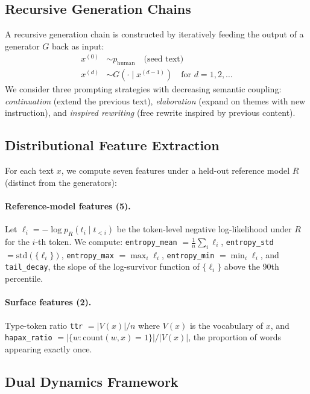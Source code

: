 \documentclass[letterpaper]{article}
\newcommand{\feat}[1]{\texttt{#1}}
\begin{document}
\subsection{Recursive Generation Chains}

A recursive generation chain is constructed by iteratively feeding the output of a generator $G$ back as input:
\begin{align}
    x^{(0)} &\sim p_{\text{human}} \quad \text{(seed text)} \\
    x^{(d)} &\sim G(\cdot \mid x^{(d-1)}) \quad \text{for } d = 1, 2, \ldots
\end{align}
We consider three prompting strategies with decreasing semantic coupling: \emph{continuation} (extend the previous text), \emph{elaboration} (expand on themes with new instruction), and \emph{inspired rewriting} (free rewrite inspired by previous content).

\subsection{Distributional Feature Extraction}

For each text $x$, we compute seven features under a held-out reference model $R$ (distinct from the generators):

\paragraph{Reference-model features (5).}
Let $\ell_i = -\log p_R(t_i \mid t_{<i})$ be the token-level negative log-likelihood under $R$ for the $i$-th token.
We compute: \feat{entropy\_mean} $= \frac{1}{n}\sum_i \ell_i$, \feat{entropy\_std} $= \text{std}(\{\ell_i\})$, \feat{entropy\_max} $= \max_i \ell_i$, \feat{entropy\_min} $= \min_i \ell_i$, and \feat{tail\_decay}, the slope of the log-survivor function of $\{\ell_i\}$ above the 90th percentile.

\paragraph{Surface features (2).}
Type-token ratio \feat{ttr} $= |V(x)| / n$ where $V(x)$ is the vocabulary of $x$, and \feat{hapax\_ratio} $= |\{w : \text{count}(w, x) = 1\}| / |V(x)|$, the proportion of words appearing exactly once.

\subsection{Dual Dynamics Framework}
\end{document}
